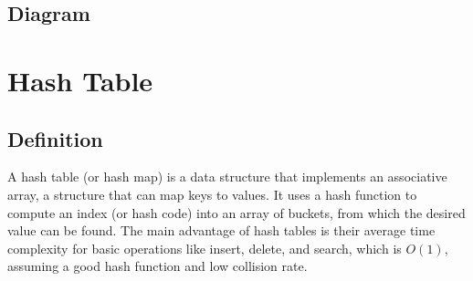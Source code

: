 \documentclass{article}
\begin{document}
\subsection{Diagram}
\begin{center}
\end{center}

\newpage

\section{Hash Table}

\subsection{Definition}
A hash table (or hash map) is a data structure that implements an associative array, a structure that can map keys to values. It uses a hash function to compute an index (or hash code) into an array of buckets, from which the desired value can be found. The main advantage of hash tables is their average time complexity for basic operations like insert, delete, and search, which is $O(1)$, assuming a good hash function and low collision rate.
\end{document}
